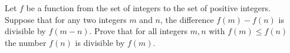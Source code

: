 Let $f$ be a function from the set of integers to the set of positive integers. Suppose that for any two integers $m$ and $n$, the difference $f(m) - f(n)$ is divisible by $f(m-n)$. Prove that for all integers $m, n$ with $f(m) \leq f(n)$ the number $f(n)$ is divisible by $f(m)$.
